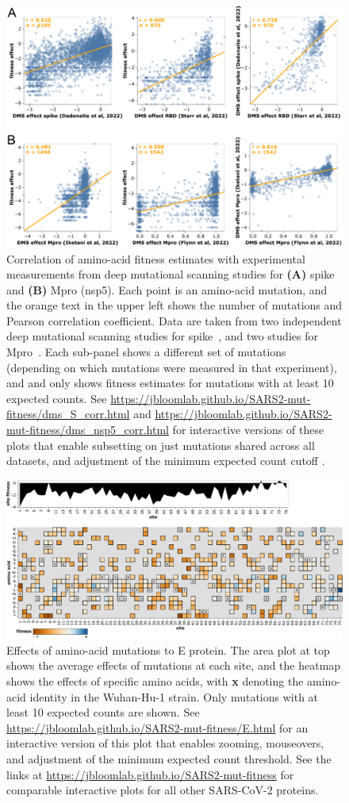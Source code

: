 \documentclass[9pt,twocolumn,twoside]{gsajnl_modified}
\begin{document}
\begin{figure}
\centering
\includegraphics[width=0.75\linewidth]{figs/dms.png}
\caption{
Correlation of amino-acid fitness estimates with experimental measurements from deep mutational scanning studies for {\bf (A)} spike and {\bf (B)} Mpro (nsp5).
Each point is an amino-acid mutation, and the orange text in the upper left shows the number of mutations and Pearson correlation coefficient.
Data are taken from two independent deep mutational scanning studies for spike~\citep{cite}, and two studies for Mpro~\citep{cite}.
Each sub-panel shows a different set of mutations (depending on which mutations were measured in that experiment), and and only shows fitness estimates for mutations with at least 10 expected counts.
See \url{https://jbloomlab.github.io/SARS2-mut-fitness/dms_S_corr.html} and \url{https://jbloomlab.github.io/SARS2-mut-fitness/dms_nsp5_corr.html} for interactive versions of these plots that enable subsetting on just mutations shared across all datasets, and adjustment of the minimum expected count cutoff .
\label{fig:dms_corr}
}
\end{figure}

\begin{figure}
\includegraphics[width=\linewidth]{figs/E_heatmap.pdf}
\caption{
Effects of amino-acid mutations to E protein.
The area plot at top shows the average effects of mutations at each site, and the heatmap shows the effects of specific amino acids, with \textbf{x} denoting the amino-acid identity in the Wuhan-Hu-1 strain.
Only mutations with at least 10 expected counts are shown.
See \url{https://jbloomlab.github.io/SARS2-mut-fitness/E.html} for an interactive version of this plot that enables zooming, mouseovers, and adjustment of the minimum expected count threshold.
See the links at \url{https://jbloomlab.github.io/SARS2-mut-fitness} for comparable interactive plots for all other SARS-CoV-2 proteins.
\label{fig:E_heatmap}
}
\end{figure}
\end{document}
